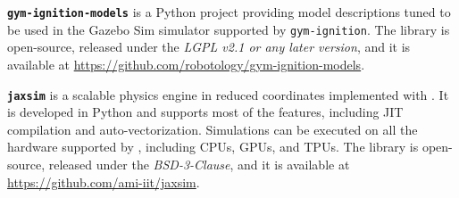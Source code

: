 \vspace{3mm}
\noindent
\textbf{\texttt{gym-ignition-models}} is a Python project providing model descriptions tuned to be used in the Gazebo Sim simulator supported by \texttt{gym-ignition}. The library is open-source, released under the \emph{LGPL v2.1 or any later version}, and it is available at \url{https://github.com/robotology/gym-ignition-models}.

\vspace{3mm}
\noindent
\textbf{\texttt{jaxsim}} is a scalable physics engine in reduced coordinates implemented with \jax. It is developed in Python and supports most of the \jax features, including \ac{JIT} compilation and auto-vectorization. Simulations can be executed on all the hardware supported by \jax, including \acp{CPU}, \acp{GPU}, and \acp{TPU}. The library is open-source, released under the \emph{BSD-3-Clause}, and it is available at \linebreak \url{https://github.com/ami-iit/jaxsim}.
